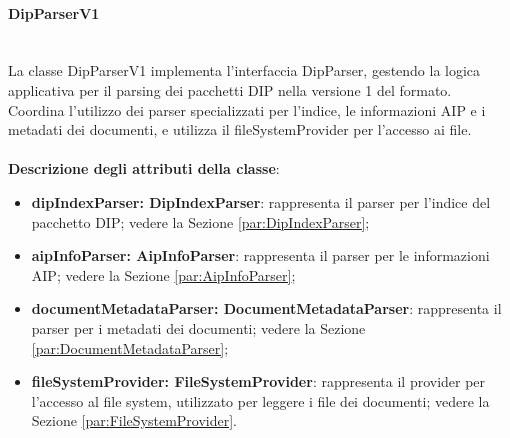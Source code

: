 \documentclass[a4paper,12pt]{article}
\begin{document}
{{{                \paragraph{DipParserV1}\label{par:DipParserV1}\mbox{}\\
                La classe DipParserV1 implementa l'interfaccia DipParser, gestendo la logica applicativa per il parsing dei pacchetti DIP nella versione 1 del formato. Coordina l'utilizzo dei parser specializzati per l'indice, le informazioni AIP e i metadati dei documenti, e utilizza il fileSystemProvider per l'accesso ai file.\\
                \\
                \textbf{Descrizione degli attributi della classe}:
                \begin{itemize}
                    \item \textbf{dipIndexParser: DipIndexParser}: rappresenta il parser per l'indice del pacchetto DIP; vedere la Sezione \ref{par:DipIndexParser};
                    \item \textbf{aipInfoParser: AipInfoParser}: rappresenta il parser per le informazioni AIP; vedere la Sezione \ref{par:AipInfoParser};
                    \item \textbf{documentMetadataParser: DocumentMetadataParser}: rappresenta il parser per i metadati dei documenti; vedere la Sezione \ref{par:DocumentMetadataParser};
                    \item \textbf{fileSystemProvider: FileSystemProvider}: rappresenta il provider per l'accesso al file system, utilizzato per leggere i file dei documenti; vedere la Sezione \ref{par:FileSystemProvider}.
                \end{itemize}
                
}}}
\end{document}
